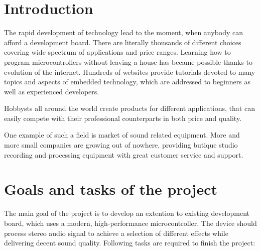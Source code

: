 \documentclass[a4paper,twoside,12pt]{book}
\begin{document}
\chapter{Introduction}\label{ch:intro}
The rapid development of technology lead to the moment,
when anybody can afford a development board.
There are literally thousands of different choices
covering wide spectrum of applications and price ranges.
Learning how to program microcontrollers without leaving a house
has became possible thanks to evolution of the internet.
Hundreds of websites provide tutorials devoted to
many topics and aspects of embedded technology,
which are addressed to beginners as well as 
experienced developers.

Hobbysts all around the world create products for different applications,
that can easily compete with their professional counterparts in both price and quality.

One example of such a field is market of sound related equipment.
More and more small companies are growing out of nowhere,
providing butique studio recording and processing equipment
with great customer service and support.




\chapter{Goals and tasks of the project}\label{ch:goals}
The main goal of the project is to develop an extention to existing development board,
which uses a modern, high-performance microcontroller.
The device should process stereo audio signal to achieve a selection of different effects
while delivering decent sound quality.
Following tasks are required to finish the project:
\end{document}
